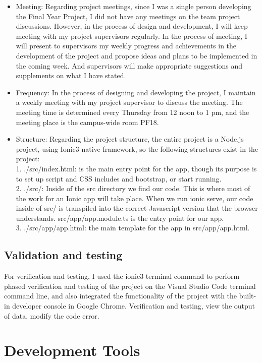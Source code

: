 \begin{itemize}
\item Meeting:  Regarding project meetings, since I was a single person developing the Final Year Project, I did not have any meetings on the team project discussions. However, in the process of design and development, I will keep meeting with my project supervisors regularly. In the process of meeting, I will present to supervisors my weekly progress and achievements in the development of the project and propose ideas and plans to be implemented in the coming week. And supervisors will make appropriate suggestions and supplements on what I have stated.

\item Frequency:  In the process of designing and developing the project, I maintain a weekly meeting with my project supervisor to discuss the meeting. The meeting time is determined every Thursday from 12 noon to 1 pm, and the meeting place is the campus-wide room PF18.
\item Structure: Regarding the project structure, the entire project is a Node.js project, using Ionic3 native framework, so the following structures exist in the project: \\ 1. ./src/index.html: is the main entry point for the app, though its purpose is to set up script and CSS includes and bootstrap, or start running. \\ 2. ./src/: Inside of the src directory we find our code. This is where most of the work for an Ionic app will take place. When we run ionic serve, our code inside of src/ is transpiled into the correct Javascript version that the browser understands. src/app/app.module.ts is the entry point for our app. \\ 3. ./src/app/app.html:  the main template for the app in src/app/app.html.

\end{itemize}

\subsection{Validation and testing}
For verification and testing, I used the ionic3 terminal command to perform phased verification and testing of the project on the Visual Studio Code terminal command line, and also integrated the functionality of the project with the built-in developer console in Google Chrome. Verification and testing, view the output of data, modify the code error.
\section{Development Tools}
